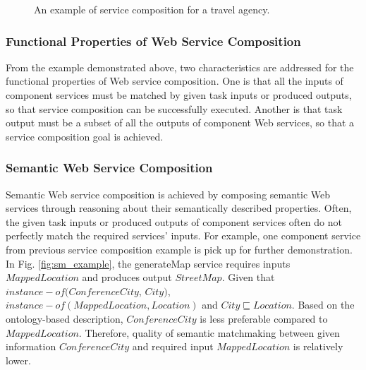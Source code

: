 \begin{figure}
\centerline{
}
\caption{An example of service composition for a travel agency.}
\label{fig:wsc_example}
\end{figure}

\subsubsection{Functional Properties of Web Service Composition}
From the example demonstrated above, two characteristics are addressed for the functional properties of Web service composition. One is that all the inputs of component services must be matched by given task inputs or produced outputs, so that service composition can be successfully executed. Another is that task output must be a subset of all the outputs of component Web services, so that a service composition goal is achieved. 


\subsubsection{Semantic Web Service Composition}

Semantic Web service composition is achieved by composing semantic Web services through reasoning about their semantically described properties. Often, the given task inputs or produced outputs of component services often do not perfectly match the required services' inputs. For example, one component service from previous service composition example is pick up for further demonstration. In Fig. \ref{fig:sm_example}, the generateMap service requires inputs $MappedLocation$ and produces output $StreetMap$. Given that $instance-of (ConferenceCity$, $City)$, $instance-of (MappedLocation, Location)$ and $City \sqsubseteq Location$. Based on the ontology-based description, $ConferenceCity$ is less preferable compared to $MappedLocation$. Therefore, quality of semantic matchmaking between given information $ConferenceCity$ and required input $MappedLocation$ is relatively lower. 

